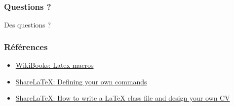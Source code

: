 \documentclass{clic_latex_beamer}
\begin{document}
 
 
\begin{frame}
\frametitle{Questions ?}
\begin{center}
\Huge Des questions ?
\end{center}
\end{frame}
 
\begin{frame}
\frametitle{Références}
\begin{itemize}
\item \href{http://en.wikibooks.org/wiki/LaTeX/Macros}{WikiBooks: Latex macros}
\item \href{http://www.sharelatex.com/learn/Defining_your_own_commands}{ShareLaTeX: Defining your own commands}
\item \href{https://www.sharelatex.com/blog/2011/03/27/how-to-write-a-latex-class-file-and-design-your-own-cv.html}{ShareLaTeX: How to write a LaTeX class file and design your own CV}
\end{itemize}
\end{frame}
\end{document}
